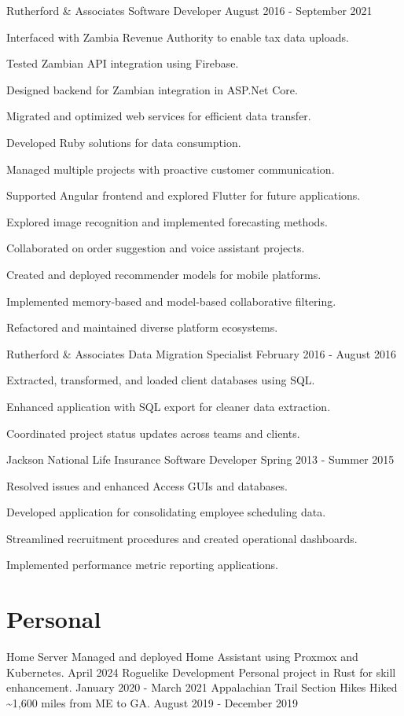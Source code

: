 \documentclass{marvinkassabian_resume}
\begin{document}
\subsectionpositiondate
{Rutherford \& Associates}
{Software Developer}
{August 2016 - September 2021}
\resumesublistbegin
\item Interfaced with Zambia Revenue Authority to enable tax data uploads.
\item Tested Zambian API integration using Firebase.
\item Designed backend for Zambian integration in ASP.Net Core.
\item Migrated and optimized web services for efficient data transfer.
\item Developed Ruby solutions for data consumption.
\item Managed multiple projects with proactive customer communication.
\item Supported Angular frontend and explored Flutter for future applications.
\item Explored image recognition and implemented forecasting methods.
\item Collaborated on order suggestion and voice assistant projects.
\item Created and deployed recommender models for mobile platforms.
\item Implemented memory-based and model-based collaborative filtering.
\item Refactored and maintained diverse platform ecosystems.
\resumesublistend

\subsectionpositiondate
{Rutherford \& Associates}
{Data Migration Specialist}
{February 2016 - August 2016}
\resumesublistbegin
\item Extracted, transformed, and loaded client databases using SQL.
\item Enhanced \cpp application with SQL export for cleaner data extraction.
\item Coordinated project status updates across teams and clients.
\resumesublistend

\subsectionpositiondate
{Jackson National Life Insurance}
{Software Developer}
{Spring 2013 - Summer 2015}
\resumesublistbegin
\item Resolved issues and enhanced Access GUIs and databases.
\item Developed application for consolidating employee scheduling data.
\item Streamlined recruitment procedures and created operational dashboards.
\item Implemented performance metric reporting applications.
\resumesublistend

\section{Personal}
\subsectionlocationdate
{Home Server}
{Managed and deployed Home Assistant using Proxmox and Kubernetes.}
{April 2024}
\subsectionlocationdate
{Roguelike Development}
{Personal project in Rust for skill enhancement.}
{January 2020 - March 2021}
\subsectionlocationdate
{Appalachian Trail Section Hikes}
{Hiked \~{}1,600 miles from ME to GA.}
{August 2019 - December 2019}
\end{document}
